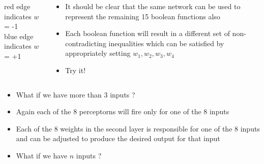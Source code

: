 \begin{frame}
	\begin{columns}
		\begin{overlayarea}{\textwidth}{\textheight}
			\vspace{1cm}
			
			red edge indicates $w$ = -1 \\
			blue edge indicates $w$ = +1
		\end{overlayarea}
		\begin{overlayarea}{\textwidth}{\textheight}
			\begin{itemize}\justifying
				\item<1-> It should be clear that the same network can be used to represent the remaining 15 boolean functions also
				\item<2-> Each boolean function will result in a different set of non-contradicting inequalities which can be satisfied by appropriately setting $w_1, w_2, w_3, w_4$
				\item<3-> Try it!
			\end{itemize}
		\end{overlayarea}
	\end{columns}
\end{frame}

\begin{frame}
	\begin{itemize}\justifying
		\item<1-> What if we have more than 3 inputs ?
	\end{itemize}
\end{frame}

\begin{frame}
	\begin{itemize}\justifying
		\item Again each of the 8 perceptorns will fire only for one of the 8 inputs
		\item Each of the 8 weights in the second layer is responsible for one of the 8 inputs and can be adjusted to produce the desired output for that input
	\end{itemize}
	
\end{frame}

\begin{frame}
	\begin{itemize}\justifying
		\item<1-> What if we have $n$ inputs ?
	\end{itemize}
\end{frame}

